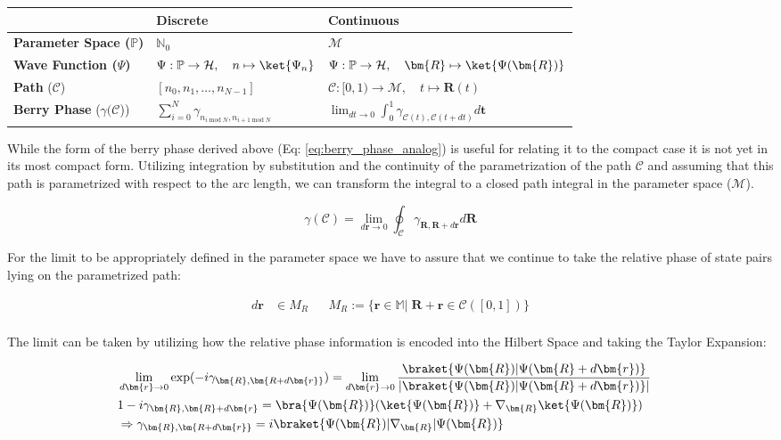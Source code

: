 \documentclass{article}
\begin{document}
\begin{tabular}{||l|l|l||}
\hline
&\textbf{Discrete} & \textbf{Continuous}\\
\hline
\textbf{Parameter Space ($\mathbb{P}$)} & $\mathbb{N}_{0}$ &  $\mathcal{M}$\\
\hline
\textbf{Wave Function ($\Psi$)} & $\Psi: \mathbb{P} \rightarrow \mathcal{H}, \quad n \mapsto \ket{\Psi_{n}}$ & $\Psi: \mathbb{P} \rightarrow \mathcal{H}, \quad \bm{R} \mapsto \ket{\Psi(\bm{R})}$ \\
\hline
\textbf{Path} ($\mathcal{C}$) &  $[n_{0}, n_{1}, \ldots, n_{N-1}]$ & $\mathcal{C}: [0, 1) \rightarrow \mathcal{M}, \quad t \mapsto \bm{R}(t)$\\
\hline
\textbf{Berry Phase} ($\gamma(\mathcal{C}$)) & $\sum_{i = 0}^{N} \gamma_{n_{i \; \mathrm{mod} \; N}, n_{i+1 \; \mathrm{mod} \; N}}$ & $\lim_{dt \to 0} \int_0^1 \gamma_{\mathcal{C}(t), \mathcal{C}(t + dt)} d \bm{t}$\\
\hline
\end{tabular}

While the form of the berry phase derived above (Eq: \ref{eq:berry_phase_analog}) is useful for relating it to the compact case it is not yet in its most compact form. Utilizing integration by substitution and the continuity of the parametrization of the path $\mathcal{C}$ and assuming that this path is parametrized with respect to the arc length, we can transform the integral to a closed path integral in the parameter space ($\mathcal{M}$).

\begin{equation*}
  \gamma(\mathcal{C}) = \lim_{d\bm{r} \to 0} \oint_{\mathcal{C}} \gamma_{\bm{R}, \bm{R}+d\bm{r}} d\bm{R}
\end{equation*}

For the limit to be appropriately defined in the parameter space we have to assure that we continue to take the relative phase of state pairs lying on the parametrized path:

\begin{align*}
d\bm{r} &\in M_{R} && M_{R} := \{\bm{r} \in \mathbb{M}|\; \bm{R} + \bm{r} \in \mathcal{C}([0, 1])\}\\
\end{align*}

The limit can be taken by utilizing how the relative phase information is encoded into the Hilbert Space and taking the Taylor Expansion:


  \begin{equation*}
    \begin{aligned}
      &\lim_{d\bm{r} \to 0} \exp(-i \gamma_{\bm{R}, \bm{R + d\bm{r}}}) = 
       \lim_{d\bm{r} \to 0}\frac{\braket{\Psi(\bm{R})|\Psi(\bm{R} + d\bm{r})}}
       {|\braket{\Psi(\bm{R})|\Psi(\bm{R} +d\bm{r})}|}&\\
      &1 - i \gamma_{\bm{R}, \bm{R} + d\bm{r}} = \bra{\Psi(\bm{R})}(\ket{\Psi(\bm{R})} + \nabla_{\bm{R}} \ket{\Psi(\bm{R})})&\\
      &\Rightarrow \gamma_{\bm{R}, \bm{R + d\bm{r}}} =
       i\braket{\Psi(\bm{R})|\nabla_{\bm{R}}|\Psi(\bm{R})}
    \end{aligned}
  \end{equation*}
\end{document}
